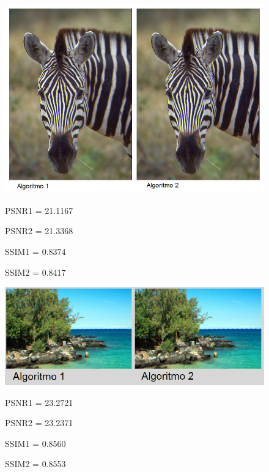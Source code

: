 \documentclass[a4paper]{article}
\begin{document}
\newpage
\begin{figure}[h!]
	\caption{}
	\begin{center}
	\includegraphics[scale=0.60]{imagenes/Vecino/zebra}
	\label{Zebra}
	
	PSNR1 =   21.1167

PSNR2 =   21.3368

SSIM1 =    0.8374

SSIM2 =    0.8417
  \end{center}
\end{figure}


\begin{figure}[h!]
	\caption{}
	\begin{center}
	\includegraphics[scale=0.06]{imagenes/Vecino/hawaiicmp}
	\label{Zebra}
	
	PSNR1 =   23.2721

PSNR2 =   23.2371

SSIM1 =    0.8560

SSIM2 =    0.8553
  \end{center}
\end{figure}

\newpage
\end{document}

